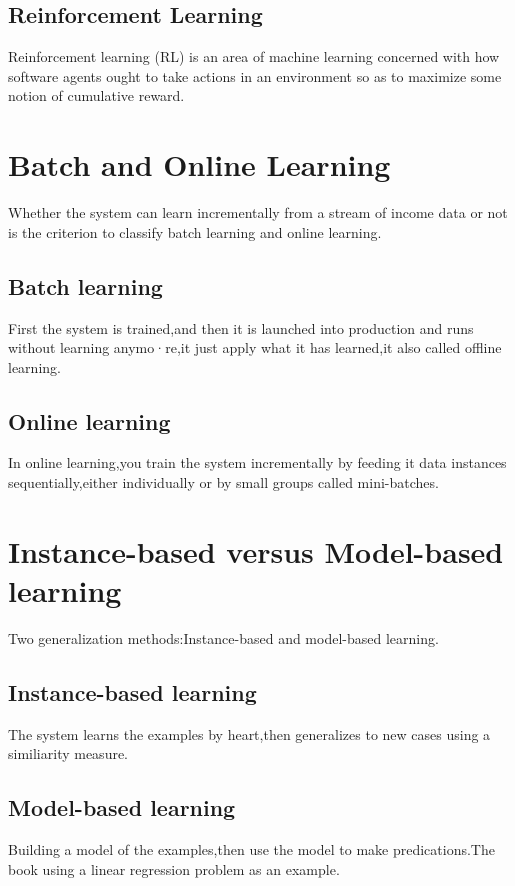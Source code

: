 \documentclass[UTF8]{ctexart}
\begin{document}
\subsection{Reinforcement Learning}
Reinforcement learning (RL) is an area of machine learning concerned with how software agents ought to take actions in an environment so as to maximize some notion of cumulative reward. 

\section{Batch and Online Learning}
Whether the system can learn incrementally from a stream of income data or not is the criterion to classify batch learning and online learning.

\subsection{Batch learning}
First the system is trained,and then it is launched into production and runs without learning anymo·re,it just apply what it has learned,it also called offline learning.

\subsection{Online learning}
In online learning,you train the system incrementally by feeding it data instances sequentially,either individually or by small groups called mini-batches.

\section{Instance-based versus Model-based learning}
Two generalization methods:Instance-based and model-based learning.

\subsection{Instance-based learning}
The system learns the examples by heart,then generalizes to new cases using a similiarity measure.

\subsection{Model-based learning}
Building a model of the examples,then use the model to make predications.The book using a linear regression problem as an example.
\end{document}
